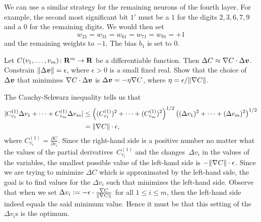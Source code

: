 \begin{solution}
We can use a similar strategy for the remaining neurons of the fourth layer. For 
example, the second most significant bit $1'$ must be a $1$ for the digits 
$2, 3, 6, 7, 9$ and a $0$ for the remaining digits. We would then set 
\[ 
w_{2 1} = w_{3 1} = w_{6 1} = w_{7 1} = w_{9 1} = +1 
\]
and the remaining weights to $-1$. The bias $b_1$ is set to $0$. 
\end{solution}

\begin{exercise}
Let $C(v_1, \ldots, v_m) \colon \mathbf{R}^m \rightarrow \mathbf{R}$ be a differentiable 
function. Then $\Delta C \approx \nabla C \cdot \Delta \boldsymbol{v}$. Constrain
$\lVert\Delta \boldsymbol{v}\rVert = \epsilon$, where $\epsilon > 0$ is a small fixed 
real. Show that the choice of $\Delta \boldsymbol{v}$ that minimizes 
$\nabla C \cdot \Delta \boldsymbol{v}$ is $\Delta \boldsymbol{v} = - \eta \nabla C$, 
where $\eta = \epsilon / \lVert\nabla C\rVert$.
\end{exercise}
\begin{solution}
The Cauchy-Schwarz inequality tells us that 
\begin{align*}
    |C_{v_1}^{(1)} \Delta v_1 + \cdots + C_{v_m}^{(1)} \Delta v_m | 
        & \leq \left ( (C_{v_1}^{(1)})^2 + \cdots + (C_{v_m}^{(1)})^2 \right )^{1/2}
        \left ( (\Delta v_1)^2 + \cdots + (\Delta v_m)^2 \right )^{1/2} \\
        & = \lVert\nabla C\rVert \cdot \epsilon,
\end{align*}
where $C_{v_i}^{(1)} = \frac{\partial C}{\partial v_i}$. Since the right-hand
side is a positive number no matter what the values of the partial
derivatives~$C_{v_i}^{(1)}$ and the changes~$\Delta v_i$ in the values of the
variables, the smallest possible value of the left-hand side is $- \lVert\nabla
C\rVert \cdot \epsilon$.  Since we are trying to minimize $\Delta C$ which is
approximated by the left-hand side, the goal is to find values for the $\Delta
v_i$ such that minimizes the left-hand side. Observe that when we set $\Delta
v_i := - \epsilon \cdot \frac{\nabla C}{\lVert\nabla C\rVert}$ for all $1 \leq i
\leq m$, then the left-hand side indeed equals the said minimum value. Hence it
must be that this setting of the $\Delta v_i$s is the optimum.
\end{solution}
